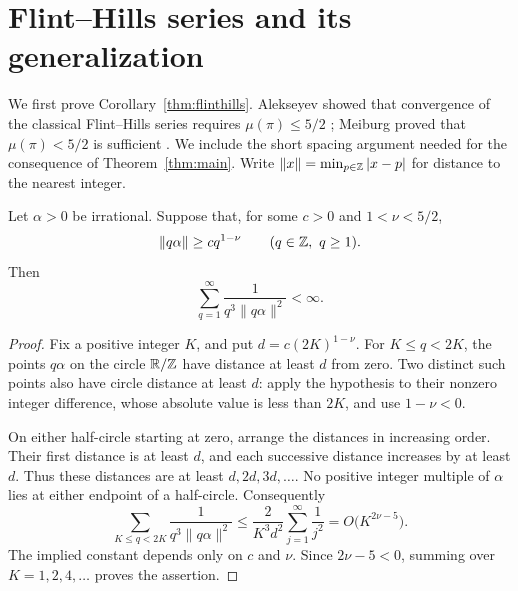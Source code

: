 \section{Flint--Hills series and its generalization}\label{sec:series}

We first prove Corollary~\ref{thm:flinthills}. Alekseyev showed
that convergence of the classical Flint--Hills series requires
\(\mu(\pi)\le5/2\) \cite[Corollary~4]{alekseyev}; Meiburg proved
that \(\mu(\pi)<5/2\) is sufficient \cite[Theorem~2.5]{meiburg}.
We include the short spacing argument needed for the consequence of
Theorem~\ref{thm:main}. Write
\(\|x\|=\min_{p\in\mathbb Z}|x-p|\) for distance to the nearest integer.

\begin{lemma}\label{series:dyadic}
Let \(\alpha>0\) be irrational. Suppose that, for some \(c>0\) and
\(1<\nu<5/2\),
\[
 \|q\alpha\|\ge c q^{1-\nu}\qquad(q\in\ZZ,\ q\ge1).
\]
Then
\[
 \sum_{q=1}^{\infty}\frac{1}{q^3\|q\alpha\|^2}<\infty.
\]
\end{lemma}

\begin{proof}
Fix a positive integer \(K\), and put
\(d=c(2K)^{1-\nu}\). For \(K\le q<2K\), the points
\(q\alpha\) on the circle \(\mathbb R/\mathbb Z\) have distance at least
\(d\) from zero. Two distinct such points also have circle distance
at least \(d\): apply the hypothesis to their nonzero integer
difference, whose absolute value is less than \(2K\), and use
\(1-\nu<0\).

On either half-circle starting at zero, arrange the distances in
increasing order. Their first distance is at least \(d\), and each
successive distance increases by at least \(d\). Thus these distances
are at least \(d,2d,3d,\ldots\). No positive integer multiple of
\(\alpha\) lies at either endpoint of a half-circle. Consequently
\[
 \sum_{K\le q<2K}\frac{1}{q^3\|q\alpha\|^2}
 \le \frac{2}{K^3d^2}\sum_{j=1}^{\infty}\frac{1}{j^2}
 =O\bigl(K^{2\nu-5}\bigr).
\]
The implied constant depends only on \(c\) and \(\nu\).
Since \(2\nu-5<0\), summing over \(K=1,2,4,\ldots\) proves
the assertion.
\end{proof}

